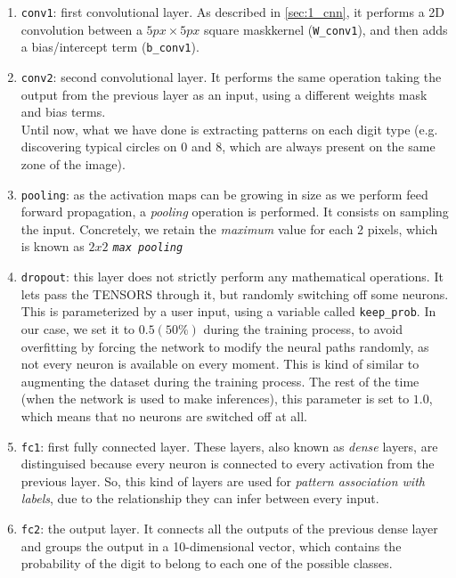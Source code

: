 				\begin{enumerate}
					\item \texttt{conv1}: first convolutional layer. As described in \autoref{sec:1_cnn}, it performs a 2D convolution between a $5px \times 5px$ square mask\/kernel (\texttt{W\_conv1}), and then adds a bias/intercept term (\texttt{b\_conv1}).\\
					\item \texttt{conv2}: second convolutional layer. It performs the same operation taking the output from the previous layer as an input, using a different weights mask and bias terms.\\
					
					Until now, what we have done is extracting patterns on each digit type (e.g. discovering typical circles on $0$ and $8$, which are always present on the same zone of the image).\\
					\item \texttt{pooling}: as the activation maps can be growing in size as we perform feed forward propagation, a \emph{pooling} operation is performed. It consists on sampling the input. Concretely, we retain the \textit{maximum} value for each 2 pixels, which is known as \textit{$2x2$ \texttt{max pooling}}
					
					\item \texttt{dropout}: this layer does not strictly perform any mathematical operations. It lets pass the TENSORS through it, but randomly switching off some neurons. This is parameterized by a user input, using a variable called \texttt{keep\_prob}. In our case, we set it to $0.5 (50\%)$ during the training process, to avoid overfitting by forcing the network to modify the neural paths randomly, as not every neuron is available on every moment. This is kind of similar to augmenting the dataset during the training process. The rest of the time (when the network is used to make inferences), this parameter is set to $1.0$, which means that no neurons are switched off at all.\\
					\item \texttt{fc1}: first fully connected layer. These layers, also known as \emph{dense} layers, are distinguised because every neuron is connected to every activation from the previous layer. So, this kind of layers are used for \textit{pattern association with labels}, due to the relationship they can infer between every input.\\
					\item \texttt{fc2}: the output layer. It connects all the outputs of the previous dense layer and groups the output in a 10-dimensional vector, which contains the probability of the digit to belong to each one of the possible classes.
					\end{enumerate}
					
